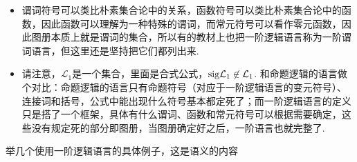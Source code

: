 \begin{itemize}
    \item 谓词符号可以类比朴素集合论中的关系，函数符号可以类比朴素集合论中的函数，因此函数可以理解为一种特殊的谓词，而常元符号可以看作零元函数，因此图册本质上就是谓词的集合，所以有的教材上也把一阶逻辑语言称为一阶谓词语言，但这里还是坚持把它们都列出来.
    \item 请注意，\(\mathcal{L}_1\)是一个集合，里面是合式公式，\({\rm sig}\mathcal{L}_1 \not \in \mathcal{L}_1\). 和命题逻辑的语言做个对比：命题逻辑的语言只有命题符号（对应于一阶逻辑语言的变元符号）、连接词和括号，公式中能出现什么符号基本都定死了；而一阶逻辑语言的定义只是搭了一个框架，具体有什么谓词、函数和常元符号可以根据需要确定，这些没有规定死的部分即图册，当图册确定好之后，一阶语言也就完整了.
\end{itemize}

举几个使用一阶逻辑语言的具体例子，这是语义的内容

